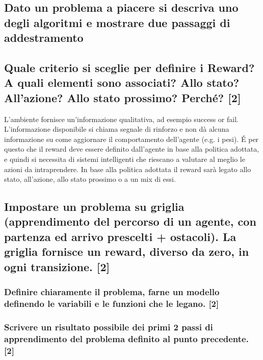 \documentclass[\main/main.tex]{subfiles}
\begin{document}
\subsection{Dato un problema a piacere si descriva uno degli algoritmi e mostrare due passaggi di addestramento}
\subsection{Quale criterio si sceglie per definire i Reward? A quali elementi sono associati? Allo stato? All'azione? Allo stato prossimo? Perché? [2]}
L'ambiente fornisce un'informazione qualitativa, ad esempio success or fail.
L'informazione disponibile si chiama segnale di rinforzo e non dà alcuna informazione su come aggiornare il comportamento dell'agente (e.g. i pesi).
É per questo che il reward deve essere definito dall'agente in base alla politica adottata, e quindi si necessita di sistemi intelligenti che riescano a valutare al meglio le azioni da intraprendere.
In base alla politica adottata il reward sarà legato allo stato, all'azione, allo stato prossimo o a un mix di essi.

\subsection{Impostare un problema su griglia (apprendimento del percorso di un agente, con partenza ed arrivo prescelti + ostacoli). La griglia fornisce un reward, diverso da zero, in ogni transizione. [2]}
\subsubsection{Definire chiaramente il problema, farne un modello definendo le variabili e le funzioni che le legano. [2]}
\subsubsection{Scrivere un risultato possibile dei primi 2 passi di apprendimento del problema definito al punto precedente. [2]}
\end{document}
